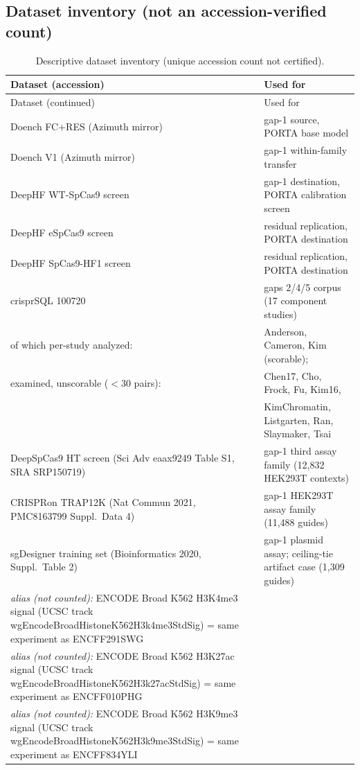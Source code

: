 \subsection{Dataset inventory (not an accession-verified count)}
\begingroup\footnotesize\setlength{\tabcolsep}{4pt}
\begin{longtable}{@{}p{}p{}@{}}
\caption{Descriptive dataset inventory (unique accession count not certified).}\label{tab:datasets}\\
\hline
Dataset (accession) & Used for \\\hline\endfirsthead
\hline Dataset (continued) & Used for \\\hline\endhead
Doench FC+RES (Azimuth mirror) & gap-1 source, PORTA base model \\
Doench V1 (Azimuth mirror) & gap-1 within-family transfer \\
DeepHF WT-SpCas9 screen & gap-1 destination, PORTA calibration screen \\
DeepHF eSpCas9 screen & residual replication, PORTA destination \\
DeepHF SpCas9-HF1 screen & residual replication, PORTA destination \\
crisprSQL 100720 & gaps 2/4/5 corpus (17 component studies) \\
\quad of which per-study analyzed: & Anderson, Cameron, Kim (scorable); \\
\quad examined, unscorable ($<$30 pairs): & Chen17, Cho, Frock, Fu, Kim16, \\
& KimChromatin, Listgarten, Ran, Slaymaker, Tsai \\
DeepSpCas9 HT screen (Sci Adv eaax9249 Table S1, SRA SRP150719) & gap-1 third assay family (12,832 HEK293T contexts) \\
CRISPRon TRAP12K (Nat Commun 2021, PMC8163799 Suppl.\ Data 4) & gap-1 HEK293T assay family (11,488 guides) \\
sgDesigner training set (Bioinformatics 2020, Suppl.\ Table 2) & gap-1 plasmid assay; ceiling-tie artifact case (1,309 guides) \\
\quad \emph{alias (not counted):} ENCODE Broad K562 H3K4me3 signal (UCSC track wgEncodeBroadHistoneK562H3k4me3StdSig) = same experiment as ENCFF291SWG \\
\quad \emph{alias (not counted):} ENCODE Broad K562 H3K27ac signal (UCSC track wgEncodeBroadHistoneK562H3k27acStdSig) = same experiment as ENCFF010PHG \\
\quad \emph{alias (not counted):} ENCODE Broad K562 H3K9me3 signal (UCSC track wgEncodeBroadHistoneK562H3k9me3StdSig) = same experiment as ENCFF834YLI \\

\end{longtable}
